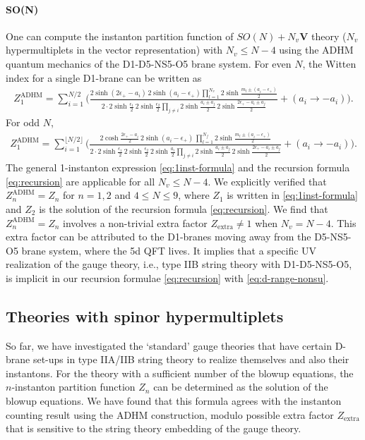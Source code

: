 \documentclass[letterpaper, 11pt]{article}
\def\e{\epsilon}
\begin{document}
{\paragraph{SO(N)} One can compute the instanton partition function of $SO(N) + N_v \mathbf{V}$ theory ($N_v$ hypermultiplets in the vector representation) with $N_v \leq N-4$ using the ADHM quantum mechanics of the D1-D5-NS5-O5 brane system. For even $N$, the Witten index for a single D1-brane can be written as
\begin{align}
Z_1^\text{ADHM} = \sum_{i=1}^{N/2}\bigg(\frac{2\sinh(2\e_+-a_i)\,2\sinh(a_i-\e_+)\prod_{l=1}^{N_v}2\sinh\frac{m_l\pm(a_i-\e_+)}{2}}{2 \cdot 2\sinh\frac{\e_1}{2}\,2\sinh\frac{\e_2}{2}\prod_{j\neq i}2\sinh\frac{a_i\pm a_j}{2}\,2\sinh\frac{2\e_+-a_i\pm a_j}{2}}+(a_i\rightarrow -a_i)\bigg).
\end{align}
For odd $N$,
\begin{align}
  Z_1^\text{ADHM} =\sum_{i=1}^{\lfloor N/2\rfloor}\bigg(\frac{2\cosh\frac{2\e_+-a_i}{2}\,2\sinh(a_i-\e_+)\,\prod_{l=1}^{N_f}2\sinh\frac{m_l\pm(a_i-\e_+)}{2}}{2 \cdot 2\sinh\frac{\e_1}{2}\,2\sinh\frac{\e_2}{2}\, 2\sinh\frac{a_i}{2}\prod_{j\neq i}2\sinh\frac{a_i\pm a_j}{2}\,2\sinh\frac{2\e_+-a_i\pm a_j}{2}}+(a_i\rightarrow -a_i)\bigg).
\end{align}
The general 1-instanton expression \eqref{eq:1inst-formula} and the recursion formula \eqref{eq:recursion} are applicable for all  $N_v \leq N-4$. We explicitly verified that $Z_n^\text{ADHM} = Z_n$ for $n=1, 2$ and $4 \leq N \leq 9$, where $Z_1$ is written in \eqref{eq:1inst-formula} and $Z_2$ is the solution of the recursion formula \eqref{eq:recursion}.  We find that $Z_n^\text{ADHM} = Z_n$ involves a non-trivial extra factor $Z_\text{extra} \neq 1$ when $N_v = N-4$. This extra factor can be attributed to the D1-branes moving away from the D5-NS5-O5 brane system, where the 5d QFT lives. It implies that a specific UV realization of the gauge theory, i.e., type IIB string theory with D1-D5-NS5-O5, is implicit in our recursion formulae \eqref{eq:recursion} with \eqref{eq:d-range-nonsu}.
 

\subsection{Theories with spinor hypermultiplets}
\label{subsec:spinor}

So far, we have investigated the `standard' gauge theories that have certain D-brane set-ups in type IIA/IIB string theory to realize themselves and also their instantons. For the theory with a sufficient number of the blowup equations, the $n$-instanton partition function $Z_n$ can be determined as the solution of the blowup equations. We have found that this formula agrees with the instanton counting result using the ADHM construction, modulo possible extra factor $Z_\text{extra}$ that is sensitive to the string theory embedding of the gauge theory.

}
\end{document}
